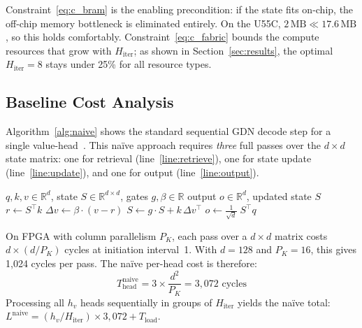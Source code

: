 \documentclass[conference]{IEEEtran}
\begin{document}
Constraint~\eqref{eq:c_bram} is the enabling precondition: if the
state fits on-chip, the off-chip memory bottleneck is eliminated
entirely.  On the U55C, $2\,\text{MB} \ll 17.6\,\text{MB}$, so this
holds comfortably.  Constraint~\eqref{eq:c_fabric} bounds the
compute resources that grow with $H_{\mathrm{iter}}$; as shown in
Section~\ref{sec:results}, the optimal $H_{\mathrm{iter}}{=}8$ stays
under 25\% for all resource types.

\subsection{Baseline Cost Analysis}

Algorithm~\ref{alg:naive} shows the standard sequential GDN decode
step for a single value-head~\cite{yang2025gated}. This na\"ive
approach requires \emph{three} full passes over the $d \times d$ state
matrix: one for retrieval (line~\ref{line:retrieve}), one for state
update (line~\ref{line:update}), and one for output
(line~\ref{line:output}).

\begin{algorithm}[t]
\caption{Standard GDN Decode Step (Single Head)}
\label{alg:naive}
\begin{algorithmic}[1]
\REQUIRE $q, k, v \in \mathbb{R}^d$, state $S \in \mathbb{R}^{d \times d}$, gates $g, \beta \in \mathbb{R}$
\ENSURE output $o \in \mathbb{R}^d$, updated state $S$
\STATE $r \leftarrow S^{\!\top} k$ \hfill{} \label{line:retrieve}
\STATE $\Delta v \leftarrow \beta \cdot (v - r)$ \hfill{}
\STATE $S \leftarrow g \cdot S + k \, \Delta v^{\!\top}$ \hfill{} \label{line:update}
\STATE $o \leftarrow \tfrac{1}{\sqrt{d}} \; S^{\!\top} q$ \hfill{} \label{line:output}
\end{algorithmic}
\end{algorithm}

On FPGA with column parallelism $P_K$, each pass over a $d \times d$
matrix costs $d \times (d / P_K)$ cycles at initiation interval~1. With
$d{=}128$ and $P_K{=}16$, this gives 1{,}024 cycles per pass.
The na\"ive per-head cost is therefore:
%
\begin{equation}
  T_{\mathrm{head}}^{\mathrm{naive}} = 3 \times \frac{d^2}{P_K}
  = 3{,}072 \text{ cycles}
  \label{eq:naive_cost}
\end{equation}
%
Processing all $h_v$ heads sequentially in groups of
$H_{\mathrm{iter}}$ yields the na\"ive total:
$L^{\mathrm{naive}} = (h_v / H_{\mathrm{iter}}) \times 3{,}072
+ T_{\mathrm{load}}$.
\end{document}
